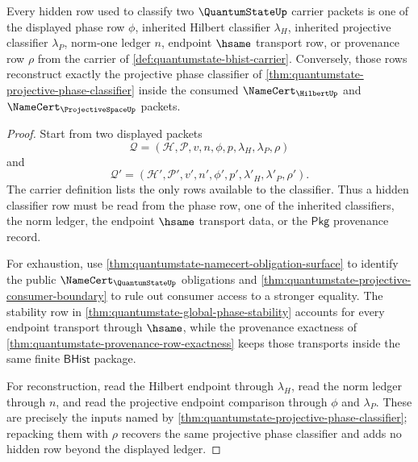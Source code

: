 
\begin{theorem}
\label{thm:quantumstate-phase-ledger-exhaustion}
Every hidden row used to classify two $\QuantumStateUp$ carrier packets is
one of the displayed phase row $\phi$, inherited Hilbert classifier
$\lambda_H$, inherited projective classifier $\lambda_P$, norm-one ledger
$n$, endpoint $\hsame$ transport row, or provenance row $\rho$ from the
carrier of \autoref{def:quantumstate-bhist-carrier}. Conversely, those
rows reconstruct exactly the projective phase classifier of
\autoref{thm:quantumstate-projective-phase-classifier} inside the consumed
$\NameCert_{\HilbertUp}$ and $\NameCert_{\ProjectiveSpaceUp}$ packets.
\end{theorem}
\begin{proof}
Start from two displayed packets
$$
\mathcal{Q}=(\mathcal{H},\mathcal{P},v,n,\phi,p,\lambda_H,\lambda_P,\rho)
$$
and
$$
\mathcal{Q}'=(\mathcal{H}',\mathcal{P}',v',n',\phi',p',\lambda'_H,\lambda'_P,\rho').
$$
The carrier definition lists the only rows available to the classifier.
Thus a hidden classifier row must be read from the phase row, one of the
inherited classifiers, the norm ledger, the endpoint $\hsame$ transport
data, or the $\mathsf{Pkg}$ provenance record.

For exhaustion, use \autoref{thm:quantumstate-namecert-obligation-surface}
to identify the public $\NameCert_{\QuantumStateUp}$ obligations and
\autoref{thm:quantumstate-projective-consumer-boundary} to rule out
consumer access to a stronger equality. The stability row in
\autoref{thm:quantumstate-global-phase-stability} accounts for every
endpoint transport through $\hsame$, while the provenance exactness of
\autoref{thm:quantumstate-provenance-row-exactness} keeps those transports
inside the same finite $\mathsf{BHist}$ package.

For reconstruction, read the Hilbert endpoint through $\lambda_H$, read the
norm ledger through $n$, and read the projective endpoint comparison through
$\phi$ and $\lambda_P$. These are precisely the inputs named by
\autoref{thm:quantumstate-projective-phase-classifier}; repacking them with
$\rho$ recovers the same projective phase classifier and adds no hidden
row beyond the displayed ledger.
\end{proof}

